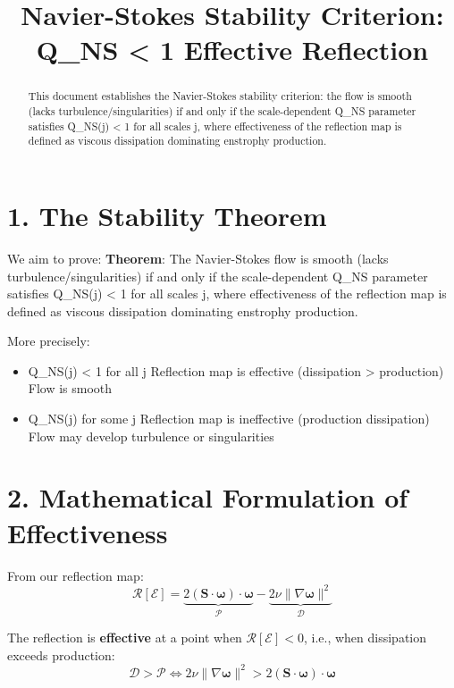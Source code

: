 \documentclass[11pt]{article}
\title{Navier-Stokes Stability Criterion: Q_{NS} < 1 \Leftrightarrow Effective Reflection}
\author{}
\date{}
\begin{document}
\maketitle
\begin{abstract}
This document establishes the Navier-Stokes stability criterion: the flow is smooth (lacks turbulence/singularities) if and only if the scale-dependent Q_{NS} parameter satisfies Q_{NS}(j) < 1 for all scales j, where effectiveness of the reflection map is defined as viscous dissipation dominating enstrophy production.
\end{abstract}

\section{1. The Stability Theorem}

We aim to prove:
\textbf{Theorem}: The Navier-Stokes flow is smooth (lacks turbulence/singularities) if and only if the scale-dependent Q_{NS} parameter satisfies Q_{NS}(j) < 1 for all scales j, where effectiveness of the reflection map is defined as viscous dissipation dominating enstrophy production.

More precisely:
\begin{itemize}
\item Q_{NS}(j) < 1 for all j \Leftrightarrow Reflection map is effective (dissipation > production) \Leftrightarrow Flow is smooth
\item Q_{NS}(j)  for some j \Leftrightarrow Reflection map is ineffective (production \geq dissipation) \Leftrightarrow Flow may develop turbulence or singularities
\end{itemize}

\section{2. Mathematical Formulation of Effectiveness}

From our reflection map:
\[
\mathcal{R}[\mathcal{E}] = \underbrace{2(\mathbf{S} \cdot \boldsymbol{\omega}) \cdot \boldsymbol{\omega}}_{\mathcal{P}} - \underbrace{2\nu \|\nabla \boldsymbol{\omega}\|^2}_{\mathcal{D}}
\]

The reflection is \textbf{effective} at a point when \(\mathcal{R}[\mathcal{E}] < 0\), i.e., when dissipation exceeds production:
\[
\mathcal{D} > \mathcal{P} \iff 2\nu \|\nabla \boldsymbol{\omega}\|^2 > 2(\mathbf{S} \cdot \boldsymbol{\omega}) \cdot \boldsymbol{\omega}
\]
\end{document}
